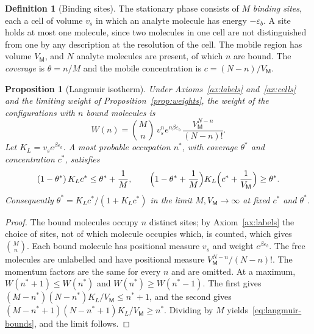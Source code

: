 \documentclass[11pt,a4paper]{article}
\newtheorem{proposition}[theorem]{Proposition}
\theoremstyle{definition}
\newtheorem{definition}[theorem]{Definition}
\theoremstyle{remark}
\newcommand{\Mob}{\mathsf{M}}
\begin{document}
\begin{definition}[Binding sites]
\label{def:sites}
The stationary phase consists of $M$ \emph{binding sites}, each a cell of volume $v_s$ in which an analyte molecule has energy $-\varepsilon_b$.
A site holds at most one molecule, since two molecules in one cell are not distinguished from one by any description at the resolution of the cell.
The mobile region has volume $V_\Mob$, and $N$ analyte molecules are present, of which $n$ are bound.
The \emph{coverage} is $\theta=n/M$ and the mobile concentration is $c=(N-n)/V_\Mob$.
\end{definition}

\begin{proposition}[Langmuir isotherm]
\label{prop:langmuir}
Under Axioms~\ref{ax:labels} and~\ref{ax:cells} and the limiting weight of Proposition~\ref{prop:weights}, the weight of the configurations with $n$ bound molecules is
\begin{equation}
W(n)=\binom Mn\,v_s^{n}e^{n\beta\varepsilon_b}\,\frac{V_\Mob^{N-n}}{(N-n)!}.
\label{eq:langmuir-weight}
\end{equation}
Let $K_L=v_se^{\beta\varepsilon_b}$.
A most probable occupation $n^\ast$, with coverage $\theta^\ast$ and concentration $c^\ast$, satisfies
\begin{equation}
(1-\theta^\ast)\,K_Lc^\ast\le\theta^\ast+\frac1M,
\qquad
\Bigl(1-\theta^\ast+\frac1M\Bigr)K_L\Bigl(c^\ast+\frac1{V_\Mob}\Bigr)\ge\theta^\ast.
\label{eq:langmuir-bounds}
\end{equation}
Consequently $\theta^\ast=K_Lc^\ast/(1+K_Lc^\ast)$ in the limit $M,V_\Mob\to\infty$ at fixed $c^\ast$ and $\theta^\ast$.
\end{proposition}

\begin{proof}
The bound molecules occupy $n$ distinct sites; by Axiom~\ref{ax:labels} the choice of sites, not of which molecule occupies which, is counted, which gives $\binom Mn$.
Each bound molecule has positional measure $v_s$ and weight $e^{\beta\varepsilon_b}$.
The free molecules are unlabelled and have positional measure $V_\Mob^{N-n}/(N-n)!$.
The momentum factors are the same for every $n$ and are omitted.
At a maximum, $W(n^\ast+1)\le W(n^\ast)$ and $W(n^\ast)\ge W(n^\ast-1)$.
The first gives $(M-n^\ast)(N-n^\ast)K_L/V_\Mob\le n^\ast+1$, and the second gives $(M-n^\ast+1)(N-n^\ast+1)K_L/V_\Mob\ge n^\ast$.
Dividing by $M$ yields~\eqref{eq:langmuir-bounds}, and the limit follows.
\end{proof}
\end{document}
